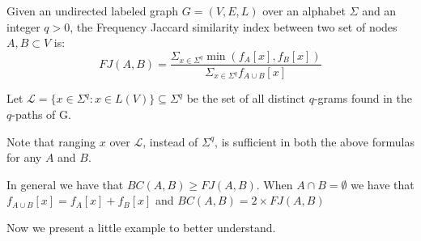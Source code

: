 \begin{definizione}
	Given an undirected labeled graph $G = (V,E,L)$ over an alphabet $\Sigma$ and an integer $q > 0$, the Frequency Jaccard similarity index between two set of nodes $A, B \subset V$ is:
	\begin{equation}\label{jaccard-sub}	
	FJ(A,B) = \frac{ \Sigma_{x \in \Sigma^{q}} \min(f_{A}[x], f_{B}[x]) }{ \Sigma_{x \in \Sigma^{q}} f_{A \cup B}[x] }
	\end{equation}
\end{definizione}

Let $\mathcal{L} = \{ x \in \Sigma^{q} : x \in L(V) \} \subseteq \Sigma^{q}$ be the set of all distinct $q$-grams found in the $q$-paths of G. 

Note that ranging $x$ over $\mathcal{L}$, instead of $\Sigma^{q}$, is sufficient in both the above formulas for any $A$ and $B$.\medskip

In general we have that $BC(A,B) \geq FJ(A,B)$. 
When $A \cap B = \emptyset$ we have that $f_{A \cup B}[x] = f_{A}[x] + f_{B}[x]$ and $BC(A,B) = 2 \times FJ(A,B)$\medskip

Now we present a little example to better understand.\medskip

